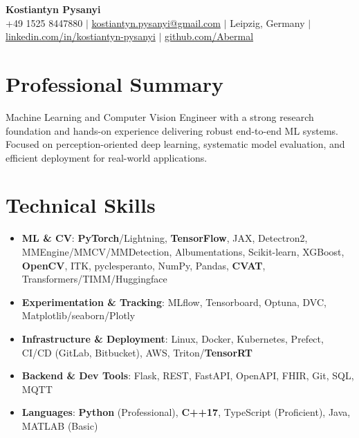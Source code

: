 \documentclass[letterpaper,10pt]{article}
\newcommand{\resumeItem}[1]{
    \item\small{#1}\vspace{-0.5pt}
}
\newcommand{\resumeSubHeadingList}{\begin{itemize}[leftmargin=0.15in, label={}]\vspace{-2pt}}
\newcommand{\resumeSubHeadingListEnd}{\end{itemize}}
\begin{document}
\begin{center}
  \textbf{\Huge Kostiantyn Pysanyi}\vspace{4pt} \\
  \small +49 1525 8447880 $|$ \href{mailto:kostiantyn.pysanyi@gmail.com}{kostiantyn.pysanyi@gmail.com} $|$ Leipzig, Germany $|$
  \href{https://www.linkedin.com/in/kostiantyn-pysanyi/}{linkedin.com/in/kostiantyn-pysanyi} $|$ \href{https://github.com/Abermal}{github.com/Abermal}
\end{center}




\section{Professional Summary}
Machine Learning and Computer Vision Engineer with a strong research foundation and hands-on experience delivering robust end-to-end ML systems. Focused on perception-oriented deep learning, systematic model evaluation, and efficient deployment for real-world applications.

\section{Technical Skills}
\resumeSubHeadingList
  \resumeItem{\textbf{ML \& CV}: \textbf{PyTorch}/Lightning, \textbf{TensorFlow}, JAX, Detectron2, MMEngine/MMCV/MMDetection, Albumentations, Scikit-learn, XGBoost, \textbf{OpenCV}, ITK, pyclesperanto, NumPy, Pandas, \textbf{CVAT}, Transformers/TIMM/Huggingface}
  \resumeItem{\textbf{Experimentation \& Tracking}: MLflow, Tensorboard, Optuna, DVC, Matplotlib/seaborn/Plotly}
  \resumeItem{\textbf{Infrastructure \& Deployment}: Linux, Docker, Kubernetes, Prefect, CI/CD (GitLab, Bitbucket), AWS, Triton/\textbf{TensorRT}}
  \resumeItem{\textbf{Backend \& Dev Tools}: Flask, REST, FastAPI, OpenAPI, FHIR, Git, SQL, MQTT}
  \resumeItem{\textbf{Languages}: \textbf{Python} (Professional), \textbf{C++17}, TypeScript (Proficient), Java, MATLAB (Basic)}
\resumeSubHeadingListEnd
\end{document}
